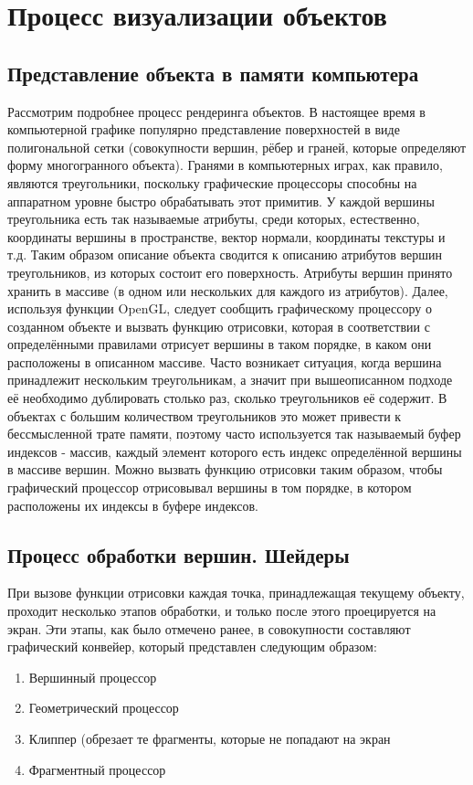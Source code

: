 \section{Процесс визуализации объектов}
\subsection{Представление объекта в памяти компьютера}
Рассмотрим подробнее процесс рендеринга объектов. В настоящее время в компьютерной графике популярно представление
поверхностей в виде полигональной сетки (совокупности вершин, рёбер и граней, которые определяют форму многогранного объекта). 
Гранями в компьютерных играх, как правило, являются треугольники, поскольку графические процессоры 
способны на аппаратном уровне быстро обрабатывать этот примитив. У каждой вершины треугольника есть так называемые 
атрибуты, среди которых, естественно, координаты вершины в пространстве, вектор нормали, координаты текстуры и т.д. 
Таким образом описание объекта сводится к описанию атрибутов вершин треугольников, из которых состоит его поверхность. 
Атрибуты вершин принято хранить в массиве (в одном или нескольких для каждого из атрибутов). Далее, 
используя функции OpenGL, следует сообщить графическому процессору о созданном объекте и вызвать функцию отрисовки, 
которая в соответствии с определёнными правилами отрисует вершины в таком порядке, 
в каком они расположены в описанном массиве. Часто возникает ситуация, когда вершина принадлежит нескольким треугольникам, 
а значит при вышеописанном подходе её необходимо дублировать столько раз, сколько треугольников её содержит. 
В объектах с большим количеством треугольников это может привести к бессмысленной трате памяти, поэтому 
часто используется так называемый буфер индексов - массив, каждый элемент которого есть индекс определённой вершины
в массиве вершин. Можно вызвать функцию отрисовки таким образом, чтобы графический процессор отрисовывал вершины в 
том порядке, в котором расположены их индексы в буфере индексов.
\subsection{Процесс обработки вершин. Шейдеры}
При вызове функции отрисовки каждая точка, принадлежащая текущему объекту, проходит несколько этапов обработки, 
и только после этого проецируется на экран. Эти этапы, как было отмечено ранее, в совокупности составляют 
графический конвейер, который представлен следующим образом:
\begin{enumerate}
\item Вершинный процессор
\item Геометрический процессор
\item Клиппер (обрезает те фрагменты, которые не попадают на экран
\item Фрагментный процессор
\end{enumerate}


